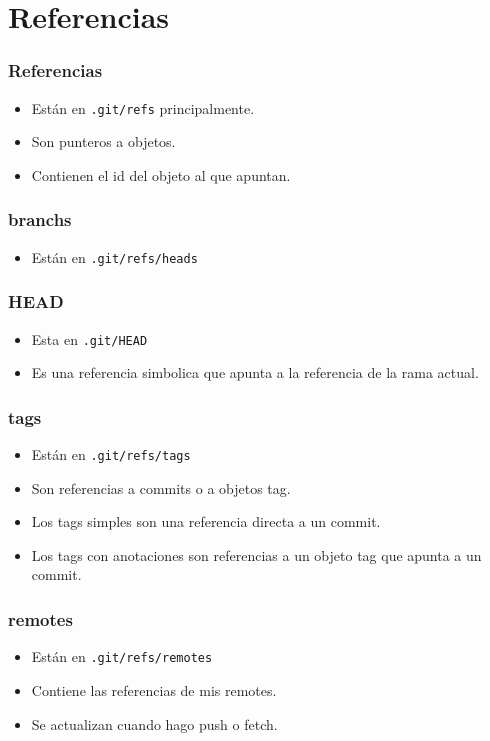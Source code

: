 \documentclass[10pt]{beamer}
\begin{document}
  \section*{Referencias}

  \begin{frame}[containsverbatim]
    \frametitle{Referencias}
    \begin{itemize}
        \item Están en \verb$.git/refs$ principalmente.
        \item Son punteros a objetos.
        \item Contienen el id del objeto al que apuntan.
    \end{itemize}
  \end{frame}

  \begin{frame}[containsverbatim]
    \frametitle{branchs}
    \begin{itemize}
        \item Están en \verb$.git/refs/heads$
    \end{itemize}
  \end{frame}

  \begin{frame}[containsverbatim]
    \frametitle{HEAD}
    \begin{itemize}
        \item Esta en \verb$.git/HEAD$
        \item Es una referencia simbolica que apunta a la referencia de la rama actual.
    \end{itemize}
  \end{frame}

  \begin{frame}[containsverbatim]
    \frametitle{tags}
    \begin{itemize}
        \item Están en \verb$.git/refs/tags$
        \item Son referencias a commits o a objetos tag.
        \item Los tags simples son una referencia directa a un commit.
        \item Los tags con anotaciones son referencias a un objeto tag que apunta a un commit.
    \end{itemize}
  \end{frame}

  \begin{frame}[containsverbatim]
    \frametitle{remotes}
    \begin{itemize}
        \item Están en \verb$.git/refs/remotes$
        \item Contiene las referencias de mis remotes.
        \item Se actualizan cuando hago push o fetch.
    \end{itemize}
  \end{frame}
\end{document}
